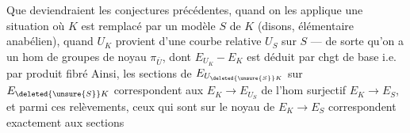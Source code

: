 Que deviendraient les conjectures précédentes, quand on les applique  une situation où $K$ est remplacé par un modèle $S$ de $K$ (disons, élémentaire anabélien), quand $U_K$ provient d'une courbe relative $U_S$ sur $S$ — de sorte qu'on a un hom de groupes
de noyau $\pi_{\bar U}$, dont $E_{U_K}-E_K$ est déduit par chgt de base i.e. par produit fibré
Ainsi, les sections de $E_{U_{\deleted{\unsure{S}}K}}$ sur $E_{\deleted{\unsure{S}}K}$ correspondent aux   $E_K\longrightarrow E_{U_S}$ de l'hom surjectif $E_K\longrightarrow E_S$, et parmi ces relèvements, ceux qui sont  sur le noyau de $E_K\longrightarrow E_S$ correspondent exactement aux sections

